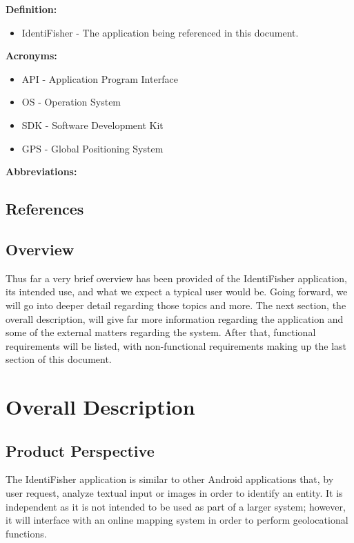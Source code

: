\documentclass{article}
\begin{document}
\textbf{Definition:}

\begin{itemize}
	\item IdentiFisher - The application being referenced in this document.
\end{itemize}
\textbf{Acronyms:}

\begin{itemize}
	\item API - Application Program Interface
	\item OS - Operation System
	\item SDK - Software Development Kit
	\item GPS - Global Positioning System
\end{itemize}

\textbf{Abbreviations:}

\subsection{References}

\subsection{Overview}
Thus far a very brief overview has been provided of the IdentiFisher application, its intended
use, and what we expect a typical user would be. Going forward, we will go into deeper detail
regarding those topics and more. The next section, the overall description, will give far more information regarding
the application and some of the external matters regarding the system. After that, functional
requirements will be listed, with non-functional requirements making up the last section of this document.

\section{Overall Description}

\subsection{Product Perspective}

The IdentiFisher application is similar to other Android applications that,
by user request, analyze textual input or images in order to identify
an entity. It is independent as it is not intended to be used as part
of a larger system; however, it will interface with an online mapping
system in order to perform geolocational functions.
\end{document}
